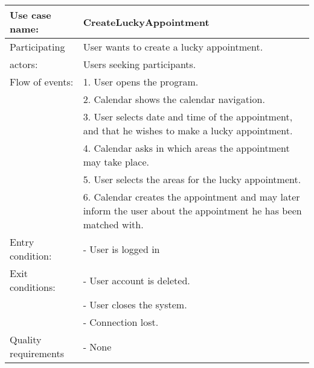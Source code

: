 {\tabulinesep=1.2mm
\begin{tabu}{ | p{3cm} | p{13cm} |}
    \hline
    Use case name: 			& 		CreateLuckyAppointment\\ \hline
    Participating  			& 		User wants to create a lucky appointment. \\
    actors:					&		Users seeking participants.\\ \hline
    Flow of events: 		& 		1. User opens the program. \\
							&		2. Calendar shows the calendar navigation.\\
							&		3. User selects date and time of the appointment, and that he wishes to make a lucky appointment.\\
							&		4. Calendar asks in which areas the appointment may take place.\\
							&		5. User selects the areas for the lucky appointment.\\
							&		6. Calendar creates the appointment and may later inform the user about the appointment he has been matched with.\\ \hline
    Entry condition: 		& 		- User is logged in  \\ \hline
	Exit conditions: 		&		- User account is deleted.\\
							&		- User closes the system.\\
							&		- Connection lost.\\\hline
	Quality requirements	&	 	- None \\\hline
\end{tabu}
}